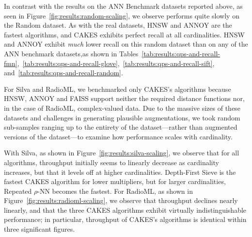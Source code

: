 In contrast with the results on the ANN Benchmark datasets reported above, as seen in Figure~\ref{fig:results:random-scaling}, we observe performs quite slowly on the Random dataset.
As with the real datasets, HNSW and ANNOY are the fastest algorithms, and CAKES exhibits perfect recall at all cardinalities.
HNSW and ANNOY exhibit \textit{much} lower recall on this random dataset than on any of the ANN benchmark datasets,as shown in Tables~\ref{tab:results:qps-and-recall-fmn},~\ref{tab:results:qps-and-recall-glove},~\ref{tab:results:qps-and-recall-sift}, and~\ref{tab:results:qps-and-recall-random}.

For Silva and RadioML, we benchmarked only CAKES's algorithms because HNSW, ANNOY and FAISS support neither the required distance functions nor, in the case of RadioML, complex-valued data.
Due to the massive sizes of these datasets and challenges in generating plausible augmentations, we took random sub-samples ranging up to the entirety of the dataset---rather than augmented versions of the dataset---to examine how performance scales with cardinality.

With Silva, as shown in Figure~\ref{fig:results:silva-scaling}, we observe that for all algorithms, throughput initially seems to linearly decrease as cardinality increases, but that it levels off at higher cardinalities.
Depth-First Sieve is the fastest CAKES algorithm for lower multipliers, but for larger cardinalities, Repeated $\rho$-NN becomes the fastest.
For RadioML, as shown in Figure~\ref{fig:results:radioml-scaling}, we observe that throughput declines nearly linearly, and that the three CAKES algorithms exhibit virtually indistinguishable performance; in particular, throughput of CAKES's algorithms is identical within three significant figures.

